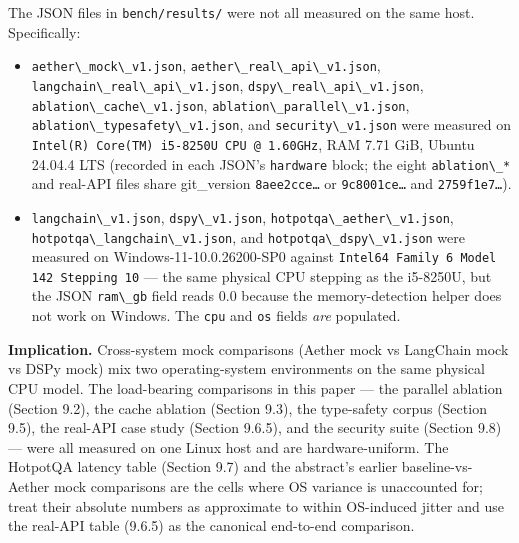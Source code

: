 \documentclass[
]{article}
\newcommand{\passthrough}[1]{#1}
\providecommand{\tightlist}{%
  \setlength{\itemsep}{0pt}\setlength{\parskip}{0pt}}
\begin{document}
The JSON files in \passthrough{\lstinline!bench/results/!} were not all
measured on the same host. Specifically:

\begin{itemize}
\tightlist
\item
  \passthrough{\lstinline!aether\_mock\_v1.json!},
  \passthrough{\lstinline!aether\_real\_api\_v1.json!},
  \passthrough{\lstinline!langchain\_real\_api\_v1.json!},
  \passthrough{\lstinline!dspy\_real\_api\_v1.json!},
  \passthrough{\lstinline!ablation\_cache\_v1.json!},
  \passthrough{\lstinline!ablation\_parallel\_v1.json!},
  \passthrough{\lstinline!ablation\_typesafety\_v1.json!}, and
  \passthrough{\lstinline!security\_v1.json!} were measured on
  \passthrough{\lstinline!Intel(R) Core(TM) i5-8250U CPU @ 1.60GHz!},
  RAM 7.71 GiB, Ubuntu 24.04.4 LTS (recorded in each JSON's
  \passthrough{\lstinline!hardware!} block; the eight
  \passthrough{\lstinline!ablation\_*!} and real-API files share
  git\_version \passthrough{\lstinline!8aee2cce…!} or
  \passthrough{\lstinline!9c8001ce…!} and
  \passthrough{\lstinline!2759f1e7…!}).
\item
  \passthrough{\lstinline!langchain\_v1.json!},
  \passthrough{\lstinline!dspy\_v1.json!},
  \passthrough{\lstinline!hotpotqa\_aether\_v1.json!},
  \passthrough{\lstinline!hotpotqa\_langchain\_v1.json!}, and
  \passthrough{\lstinline!hotpotqa\_dspy\_v1.json!} were measured on
  Windows-11-10.0.26200-SP0 against
  \passthrough{\lstinline!Intel64 Family 6 Model 142 Stepping 10!} ---
  the same physical CPU stepping as the i5-8250U, but the JSON
  \passthrough{\lstinline!ram\_gb!} field reads 0.0 because the
  memory-detection helper does not work on Windows. The
  \passthrough{\lstinline!cpu!} and \passthrough{\lstinline!os!} fields
  \emph{are} populated.
\end{itemize}

\textbf{Implication.} Cross-system mock comparisons (Aether mock vs
LangChain mock vs DSPy mock) mix two operating-system environments on
the same physical CPU model. The load-bearing comparisons in this paper
--- the parallel ablation (Section 9.2), the cache ablation (Section
9.3), the type-safety corpus (Section 9.5), the real-API case study
(Section 9.6.5), and the security suite (Section 9.8) --- were all
measured on one Linux host and are hardware-uniform. The HotpotQA
latency table (Section 9.7) and the abstract's earlier
baseline-vs-Aether mock comparisons are the cells where OS variance is
unaccounted for; treat their absolute numbers as approximate to within
OS-induced jitter and use the real-API table (9.6.5) as the canonical
end-to-end comparison.
\end{document}
